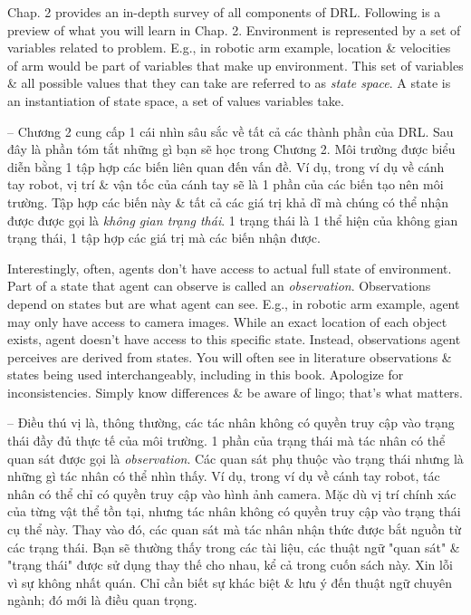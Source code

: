 \documentclass{article}
\begin{document}
\begin{itemize}
\begin{itemize}
\begin{itemize}
            Chap. 2 provides an in-depth survey of all components of DRL. Following is a preview of what you will learn in Chap. 2. Environment is represented by a set of variables related to problem. E.g., in robotic arm example, location \& velocities of arm would be part of variables that make up environment. This set of variables \& all possible values that they can take are referred to as {\it state space}. A state is an instantiation of state space, a set of values variables take.

            -- Chương 2 cung cấp 1 cái nhìn sâu sắc về tất cả các thành phần của DRL. Sau đây là phần tóm tắt những gì bạn sẽ học trong Chương 2. Môi trường được biểu diễn bằng 1 tập hợp các biến liên quan đến vấn đề. Ví dụ, trong ví dụ về cánh tay robot, vị trí \& vận tốc của cánh tay sẽ là 1 phần của các biến tạo nên môi trường. Tập hợp các biến này \& tất cả các giá trị khả dĩ mà chúng có thể nhận được được gọi là {\it không gian trạng thái}. 1 trạng thái là 1 thể hiện của không gian trạng thái, 1 tập hợp các giá trị mà các biến nhận được.

            Interestingly, often, agents don't have access to actual full state of environment. Part of a state that agent can observe is called an {\it observation}. Observations depend on states but are what agent can see. E.g., in robotic arm example, agent may only have access to camera images. While an exact location of each object exists, agent doesn't have access to this specific state. Instead, observations agent perceives are derived from states. You will often see in literature observations \& states being used interchangeably, including in this book. Apologize for inconsistencies. Simply know differences \& be aware of lingo; that's what matters.

            -- Điều thú vị là, thông thường, các tác nhân không có quyền truy cập vào trạng thái đầy đủ thực tế của môi trường. 1 phần của trạng thái mà tác nhân có thể quan sát được gọi là {\it observation}. Các quan sát phụ thuộc vào trạng thái nhưng là những gì tác nhân có thể nhìn thấy. Ví dụ, trong ví dụ về cánh tay robot, tác nhân có thể chỉ có quyền truy cập vào hình ảnh camera. Mặc dù vị trí chính xác của từng vật thể tồn tại, nhưng tác nhân không có quyền truy cập vào trạng thái cụ thể này. Thay vào đó, các quan sát mà tác nhân nhận thức được bắt nguồn từ các trạng thái. Bạn sẽ thường thấy trong các tài liệu, các thuật ngữ "quan sát" \& "trạng thái" được sử dụng thay thế cho nhau, kể cả trong cuốn sách này. Xin lỗi vì sự không nhất quán. Chỉ cần biết sự khác biệt \& lưu ý đến thuật ngữ chuyên ngành; đó mới là điều quan trọng.


\end{itemize}
\end{itemize}
\end{itemize}
\end{document}

